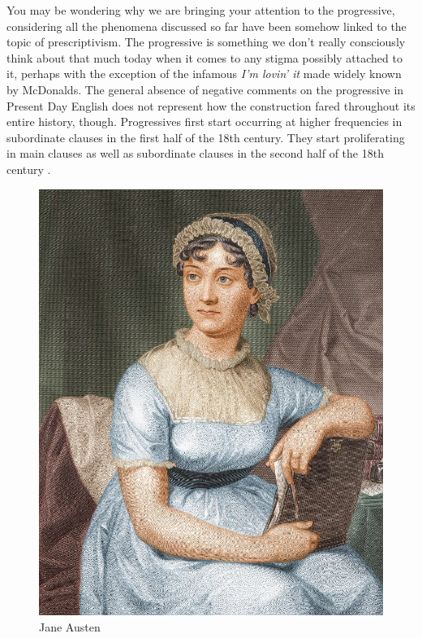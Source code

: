 You may be wondering why we are bringing your attention to the progressive, considering all the phenomena discussed so far have been somehow linked to the topic of prescriptivism. The progressive is something we don't really consciously think about that much today when it comes to any stigma possibly attached to it, perhaps with the exception of the infamous \textit{I'm lovin' it} made widely known by McDonalds. The general absence of negative comments on the progressive in Present Day English does not represent how the construction fared throughout its entire history, though. Progressives first start occurring at higher frequencies in subordinate clauses in the first half of the 18th century. They start proliferating in main clauses as well as subordinate clauses in the second half of the 18th century \citep[78]{Beal2004}. 

\begin{figure}
    \includegraphics[scale=0.15]{chapters/img/Jane_Austen_coloured_version.jpg}
    \caption{Jane Austen}
    \label{fig:LME_Austen}
\end{figure}

